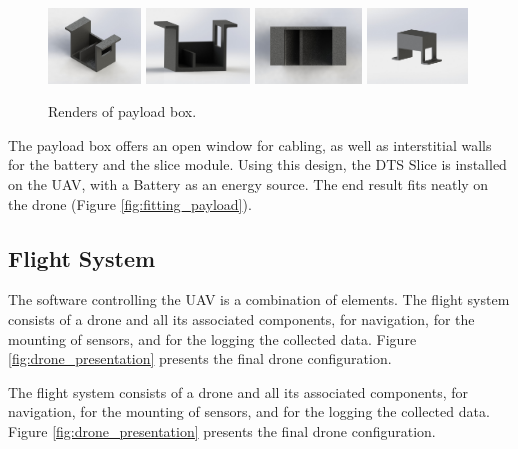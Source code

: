 \begin{figure}[h]
    \raggedright
    \includegraphics[height=2cm]{images/stage_system/renders/payload_box/1.JPG}
    \includegraphics[height=2cm]{images/stage_system/renders/payload_box/2.JPG}
    \includegraphics[height=2cm]{images/stage_system/renders/payload_box/3.JPG}    
    \includegraphics[height=2cm]{images/stage_system/renders/payload_box/4.JPG}
    \caption{Renders of payload box.}
\end{figure}

The payload box offers an open window for cabling, as well as interstitial walls for the battery and the slice module. Using this design, the DTS Slice is installed on the UAV,  with a Battery as an energy source. The end result fits neatly on the drone (Figure \ref{fig:fitting_payload}). 


\subsection{Flight System}\label{section:flight_system}

The software controlling the UAV is a combination of elements. The flight system consists of a drone and all its associated components, for navigation, for the mounting of sensors, and for the logging the collected data. Figure \ref{fig:drone_presentation} presents the final drone configuration.

The flight system consists of a drone and all its associated components, for navigation, for the mounting of sensors, and for the logging the collected data. Figure \ref{fig:drone_presentation} presents the final drone configuration.

